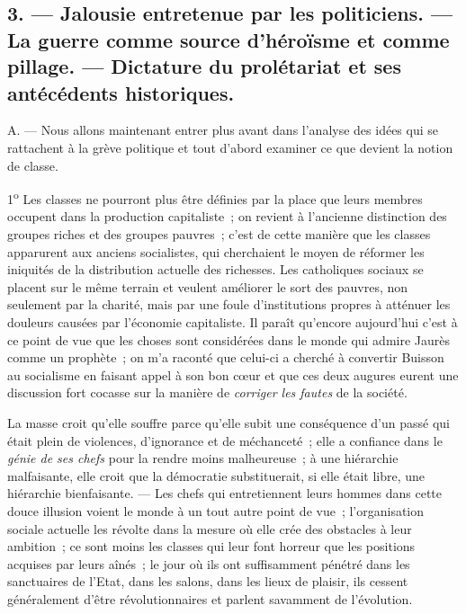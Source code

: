 \documentclass[french,twoside]{book} %
\begin{document}
\subsection[{3. — Jalousie entretenue par les politiciens. — La guerre comme source d’héroïsme et comme pillage. — Dictature du prolétariat et ses antécédents historiques.}]{3. — Jalousie entretenue par les politiciens. — La guerre comme source d’héroïsme et comme pillage. — Dictature du prolétariat et ses antécédents historiques.}
\label{p22}
\noindent A. — Nous allons maintenant entrer plus avant dans l’analyse des idées qui se rattachent à la grève politique et tout d’abord examiner ce que devient la notion de classe.\par
1\textsuperscript{o} Les classes ne pourront plus être définies par la place que leurs membres occupent dans la production capitaliste ; on revient à l’ancienne distinction des groupes riches et des groupes pauvres ; c’est de cette manière que les classes apparurent aux anciens socialistes, qui cherchaient le moyen de réformer les iniquités de la distribution actuelle des richesses. Les catholiques sociaux se placent sur le même terrain et veulent améliorer le sort des  pauvres, non seulement par la charité, mais par une foule d’institutions propres à atténuer les douleurs causées par l’économie capitaliste. Il paraît qu’encore aujourd’hui c’est à ce point de vue que les choses sont considérées dans le monde qui admire Jaurès comme un prophète ; on m’a raconté que celui-ci a cherché à convertir Buisson au socialisme en faisant appel à son bon cœur et que ces deux augures eurent une discussion fort cocasse sur la manière de \emph{corriger les fautes} de la société.\par
La masse croit qu’elle souffre parce qu’elle subit une conséquence d’un passé qui était plein de violences, d’ignorance et de méchanceté ; elle a confiance dans le \emph{génie de ses chefs} pour la rendre moins malheureuse ; à une hiérarchie malfaisante, elle croit que la démocratie substituerait, si elle était libre, une hiérarchie bienfaisante. — Les chefs qui entretiennent leurs hommes dans cette douce illusion voient le monde à un tout autre point de vue ; l’organisation sociale actuelle les révolte dans la mesure où elle crée des obstacles à leur ambition ; ce sont moins les classes qui leur font horreur que les positions acquises par leurs aînés ; le jour où ils ont suffisamment pénétré dans les sanctuaires de l’Etat, dans les salons, dans les lieux de plaisir, ils cessent généralement d’être révolutionnaires et parlent savamment de l’évolution.\par
\end{document}
